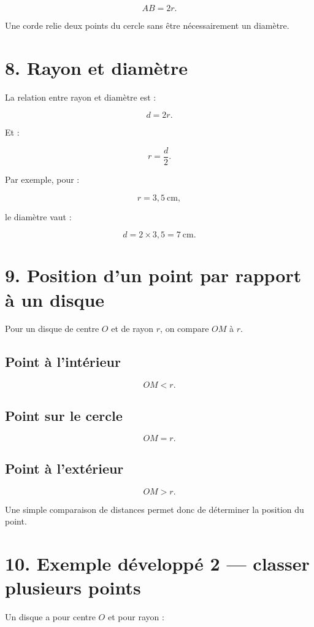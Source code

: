 \[
AB=2r.
\]

Une corde relie deux points du cercle sans être nécessairement un diamètre.

\section{8. Rayon et diamètre}

La relation entre rayon et diamètre est :

\[
\boxed{d=2r}.
\]

Et :

\[
\boxed{r=\dfrac{d}{2}}.
\]

Par exemple, pour :

\[
r=3{,}5\ \text{cm},
\]

le diamètre vaut :

\[
d=2\times3{,}5=7\ \text{cm}.
\]

\section{9. Position d’un point par rapport à un disque}

Pour un disque de centre $O$ et de rayon $r$, on compare $OM$ à $r$.

\subsection{Point à l’intérieur}

\[
OM<r.
\]

\subsection{Point sur le cercle}

\[
OM=r.
\]

\subsection{Point à l’extérieur}

\[
OM>r.
\]

Une simple comparaison de distances permet donc de déterminer la position du point.

\section{10. Exemple développé 2 — classer plusieurs points}

Un disque a pour centre $O$ et pour rayon :


